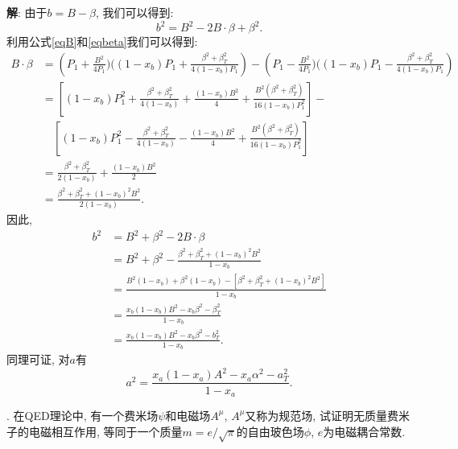\documentclass{ctexart}
\newcounter{mycnt}
\newenvironment{problem}{\noindent \stepcounter{mycnt}\themycnt.}{

}
\newenvironment{answer}{\textbf{解}:}{
\vspace{0.5cm}
}
\begin{document}
\begin{answer}
由于$b = B - \beta$, 我们可以得到:
\begin{equation}
  b^2 = B^2 - 2B\cdot \beta + \beta^2.
\end{equation}
利用公式\eqref{eqB}和\eqref{eqbeta}我们可以得到:
\begin{equation}
  \begin{split}
    B\cdot\beta &= \left(P_1 + \frac{B^2}{4P_1})((1-x_b)P_1 + \frac{\beta^2+\beta_T^2}{4(1-x_b)P_1}\right) - \left(P_1 - \frac{B^2}{4P_1})((1-x_b)P_1 - \frac{\beta^2+\beta_T^2}{4(1-x_b)P_1}\right) \\
    &= \left[(1-x_b)P_1^2 + \frac{\beta^2+\beta_T^2}{4(1-x_b)} + \frac{(1-x_b)B^2}{4} + \frac{B^2(\beta^2+\beta_T^2)}{16(1-x_b)P_1^2}\right] - \\
    & \quad \left[(1-x_b)P_1^2 - \frac{\beta^2+\beta_T^2}{4(1-x_b)} - \frac{(1-x_b)B^2}{4} + \frac{B^2(\beta^2+\beta_T^2)}{16(1-x_b)P_1^2}\right] \\
    &= \frac{\beta^2 + \beta_T^2}{2(1-x_b)} + \frac{(1-x_b)B^2}{2} \\
    &= \frac{\beta^2 + \beta_T^2 + (1-x_b)^2B^2}{2(1-x_b)}.
  \end{split}
\end{equation}
因此,
\begin{equation}
  \begin{split}
    b^2 &= B^2 + \beta^2 - 2B\cdot \beta \\
    &= B^2 + \beta^2 - \frac{\beta^2 + \beta_T^2 + (1-x_b)^2B^2}{1-x_b} \\
    &= \frac{B^2(1-x_b) + \beta^2(1-x_b) - [\beta^2 + \beta_T^2 + (1-x_b)^2B^2]}{1-x_b} \\
    &= \frac{x_b(1-x_b)B^2 - x_b \beta^2 -\beta_T^2}{1-x_b} \\
    &= \frac{x_b(1-x_b)B^2 - x_b \beta^2 - b_T^2}{1-x_b}.
  \end{split}
\end{equation}
同理可证, 对$a$有
\begin{equation}
  a^2 = \frac{x_a(1-x_a)A^2 - x_a \alpha^2 - a_T^2}{1-x_a}.
\end{equation}
\end{answer}

\begin{problem}
  在QED理论中, 有一个费米场$\psi$和电磁场$A^\mu$, $A^\mu$又称为规范场, 试证明无质量费米子的电磁相互作用, 等同于一个质量$m = e/\sqrt{\pi}$的自由玻色场$\phi$, $e$为电磁耦合常数.
\end{problem}
\end{document}
